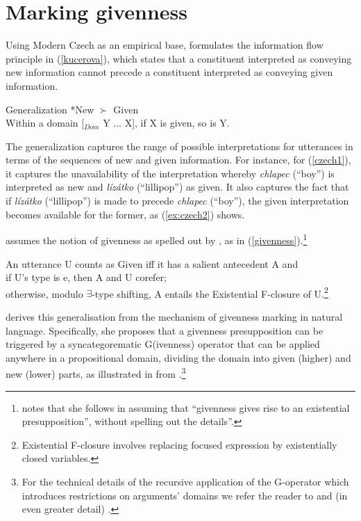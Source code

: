 \documentclass[output=paper,modfonts,nonflat]{langsci/langscibook}
\begin{document}
\section{Marking givenness}

Using Modern Czech as an empirical base, \citet{Kucerova:2012} formulates the information flow principle in (\ref{kucerova}), which states that a constituent interpreted as conveying new information cannot precede a constituent interpreted as conveying given information. 

\ea \label{kucerova}
Generalization *New $\succ$ Given \\
Within a domain [$_{Dom}$ Y ... X], if X is given, so is Y. \hfill \citet[14]{Kucerova:2012}
\z

The generalization captures the range of possible interpretations for utterances in terms of the sequences of new and given information. For instance, for (\ref{czech1}), it captures the unavailability of the interpretation whereby {\it chlapec} (``boy'') is interpreted as new and {\it l\'{i}z\'{a}tko} (``lillipop'') as given. It also captures the fact that if {\it l\'{i}z\'{a}tko} (``lillipop'') is made to precede {\it chlapec} (``boy''), the given interpretation becomes available for the former, as (\ref{ex:czech2}) shows.

\citet[18]{Kucerova:2012} assumes the notion of givenness as spelled out by \citet[151]{Schwarzschild:1999}, as in (\ref{givenness}).\footnote{\citet[18]{Kucerova:2012} notes that she follows \citealt{Sauerland:2005} in assuming that ``givenness gives rise to an existential presupposition'', without spelling out the details''.}

\ea\label{givenness}
An utterance U counts as Given iff it has a salient antecedent A and\\
\ea if U's type is e, then A and U corefer;\\
\ex otherwise, modulo $\exists$-type shifting, A entails the Existential F-closure of U.\footnote{Existential F-closure involves replacing focused expression by existentially closed variables.}
\z
\z

\citet[14]{Kucerova:2012} derives this generalisation from the mechanism of givenness marking in natural language. Specifically, she proposes that a givenness presupposition can be triggered by a syncategorematic G(ivenness) operator that can be applied anywhere in a propositional domain, dividing the domain into given (higher) and new (lower) parts, as illustrated in  from \citet[3]{Kucerova:2012}.\footnote{For the technical details of the recursive application of the G-operator which introduces restrictions on arguments' domains we refer the reader to \citet{Kucerova:2012} and (in even greater detail) \citet{SimikWierzba:2015}.}
\end{document}
